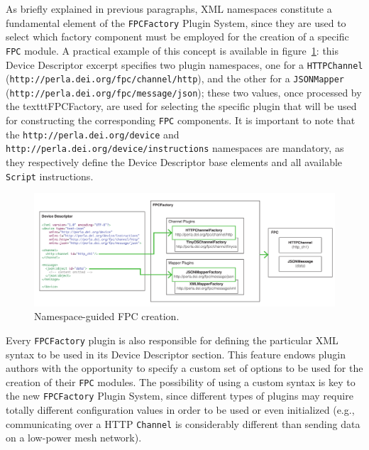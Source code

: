 As briefly explained in previous paragraphs, XML namespaces constitute a
fundamental element of the \texttt{FPCFactory} Plugin System, since they are
used to select which factory component must be employed for the creation of a
specific \texttt{FPC} module. A practical example of this concept is available
in figure~\ref{fig:dd_namespace}: this Device Descriptor excerpt specifies two
plugin namespaces, one for a \texttt{HTTPChannel}
(\texttt{http://perla.dei.org/fpc/channel/http}), and the other for a
\texttt{JSONMapper} (\texttt{http://perla.dei.org/fpc/message/json}); these two
values, once processed by the texttt{FPCFactory}, are used for selecting the
specific plugin that will be used for constructing the corresponding
\texttt{FPC} components. It is important to note that the
\texttt{http://perla.dei.org/device} and
\texttt{http://perla.dei.org/device/instructions} namespaces are mandatory, as
they respectively define the Device Descriptor base elements and all available
\texttt{Script} instructions.

\begin{figure}[h!]
\center
\includegraphics[width=\textwidth]{imgs/dd_namespace.pdf}
\caption{Namespace-guided FPC creation.}
\label{fig:dd_namespace}
\end{figure}

Every \texttt{FPCFactory} plugin is also responsible for defining the
particular XML syntax to be used in its Device Descriptor section. This feature
endows plugin authors with the opportunity to specify a custom set of options
to be used for the creation of their \texttt{FPC} modules. The possibility of
using a custom syntax is key to the new \texttt{FPCFactory} Plugin System,
since different types of plugins may require totally different configuration
values in order to be used or even initialized (e.g., communicating over a HTTP
\texttt{Channel} is considerably different than sending data on a low-power
mesh network).

